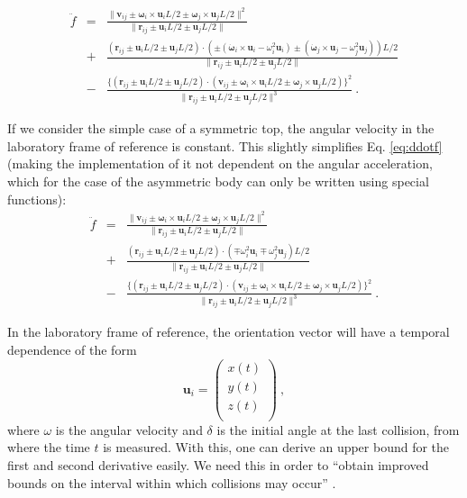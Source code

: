 \documentclass[aps,pre,onecolumn,preprint,showpacs]{revtex4}
\begin{document}
\begin{eqnarray}
  \label{eq:ddotf}
 \nonumber  \ddot{f} &=&  \frac{\|\mathbf{v}_{ij} \pm \mathbf{\omega}_i\times\mathbf{u}_{i}L/2 \pm \mathbf{\omega}_j\times\mathbf{u}_{j}L/2\|^2}{\|\mathbf{r}_{ij} \pm \mathbf{u}_{i}L/2 \pm \mathbf{u}_{j}L/2\|} \\
&+&  \frac{ (\mathbf{r}_{ij} \pm \mathbf{u}_{i}L/2 \pm \mathbf{u}_{j}L/2)\cdotp(\pm (\dot{\mathbf{\omega}}_i\times\mathbf{u}_i - \omega_i^2\mathbf{u}_i) \pm (\dot{\mathbf{\omega}}_j\times\mathbf{u}_j - \omega_j^2\mathbf{u}_j))L/2}{\|\mathbf{r}_{ij} \pm \mathbf{u}_{i}L/2 \pm \mathbf{u}_{j}L/2\|} \\
 \nonumber &-& \frac{\{(\mathbf{r}_{ij} \pm \mathbf{u}_{i}L/2 \pm \mathbf{u}_{j}L/2)\cdotp(\mathbf{v}_{ij} \pm \mathbf{\omega}_i\times\mathbf{u}_{i}L/2 \pm \mathbf{\omega}_j\times\mathbf{u}_{j}L/2)\}^2}{\|\mathbf{r}_{ij} \pm \mathbf{u}_{i}L/2 \pm \mathbf{u}_{j}L/2\|^3} ~.
\end{eqnarray}


If we consider the simple case of a symmetric top, the angular
velocity in the laboratory frame of reference is constant. This
slightly simplifies Eq. \eqref{eq:ddotf} (making the implementation of
it not dependent on the angular acceleration, which for the case of
the asymmetric body can only be written using special functions):
\begin{eqnarray}
  \label{eq:ddotfST}
  \nonumber \ddot{f} &=&  \frac{\|\mathbf{v}_{ij} \pm \mathbf{\omega}_i\times\mathbf{u}_{i}L/2 \pm \mathbf{\omega}_j\times\mathbf{u}_{j}L/2\|^2}{\|\mathbf{r}_{ij} \pm \mathbf{u}_{i}L/2 \pm \mathbf{u}_{j}L/2\|} \\
&+&  \frac{ (\mathbf{r}_{ij} \pm \mathbf{u}_{i}L/2 \pm \mathbf{u}_{j}L/2)\cdotp(\mp  \omega_i^2\mathbf{u}_i \mp  \omega_j^2\mathbf{u}_j)L/2}{\|\mathbf{r}_{ij} \pm \mathbf{u}_{i}L/2 \pm \mathbf{u}_{j}L/2\|} \\
&-& \nonumber \frac{\{(\mathbf{r}_{ij} \pm \mathbf{u}_{i}L/2 \pm \mathbf{u}_{j}L/2)\cdotp(\mathbf{v}_{ij} \pm \mathbf{\omega}_i\times\mathbf{u}_{i}L/2 \pm \mathbf{\omega}_j\times\mathbf{u}_{j}L/2)\}^2}{\|\mathbf{r}_{ij} \pm \mathbf{u}_{i}L/2 \pm \mathbf{u}_{j}L/2\|^3} ~.
\end{eqnarray}

In the laboratory frame of reference, the orientation vector will have
a temporal dependence of the form \[\mathbf{u}_i =
\left( {\begin{array}{cc}
x(t) \\
y(t) \\
z(t) \\
 \end{array} } \right) ~,\] where $\omega$ is the
angular velocity and $\delta$ is the initial angle at the last
collision, from where the time $t$ is measured. With this, one can
derive an upper bound for the first and second derivative easily. We
need this in order to ``obtain improved bounds on the interval within
which collisions may occur'' \cite{frenkel}.
\end{document}

